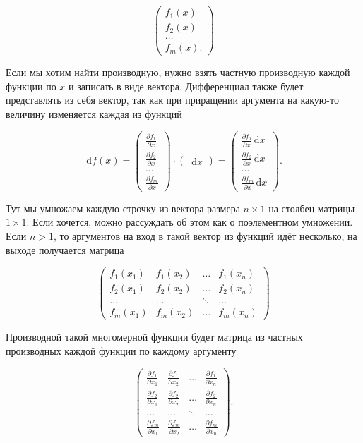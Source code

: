 \documentclass[12pt,fleqn]{article}
\newcommand{\dx}[1]{\,\mathrm{d}#1} %
\begin{document}
\begin{enumerate}
\[
\begin{pmatrix} f_1(x) \\ f_2(x) \\ \ldots  \\ f_m(x). \end{pmatrix}
\]

Если мы хотим найти производную, нужно взять частную производную каждой функции по $x$ и записать в виде вектора. Дифференциал также будет представлять из себя вектор, так как при приращении аргумента на какую-то величину изменяется каждая из функций 

\[
\dx{f(x)} = \begin{pmatrix} \frac{\partial f_1}{\partial x} \\ \frac{\partial f_2}{\partial x} \\ \ldots  \\ \frac{\partial f_m}{\partial x} \end{pmatrix} \cdot \begin{pmatrix} \dx{x}  \end{pmatrix}  = \begin{pmatrix} \frac{\partial f_1}{\partial x} \dx{x} \\ \frac{\partial f_2}{\partial x} \dx{x} \\ \ldots  \\ \frac{\partial f_m}{\partial x} \dx{x} \end{pmatrix}.
\]

Тут мы умножаем каждую строчку из вектора размера $n \times 1$ на столбец матрицы $1 \times 1$. Если хочется, можно рассуждать об этом как о поэлементном умножении. Если $n > 1$, то аргументов на вход в такой вектор из функций идёт несколько, на выходе получается матрица 

\[
\begin{pmatrix} f_1(x_1) & f_1(x_2) & \ldots & f_1(x_n) \\ f_2(x_1)  & f_2(x_2) & \ldots & f_2(x_n)  \\ \ldots & \ldots & \ddots & \ldots  \\ f_m(x_1)  & f_m(x_2) & \ldots & f_m(x_n) \end{pmatrix}
\]
  
Производной такой многомерной функции будет матрица из частных производных каждой функции по каждому аргументу

\[
\begin{pmatrix} \frac{\partial f_1}{\partial x_1} & \frac{\partial f_1}{\partial x_2} & \ldots & \frac{\partial f_1}{\partial x_n} \\ \frac{\partial f_2}{\partial x_1}  & \frac{\partial f_2}{\partial x_2} & \ldots & \frac{\partial f_2}{\partial x_n}  \\ \ldots & \ldots & \ddots & \ldots  \\ \frac{\partial f_m}{\partial x_1}  & \frac{\partial f_m}{\partial x_2} & \ldots & \frac{\partial f_m}{\partial x_n} \end{pmatrix}.
\]


\end{enumerate}
\end{document}
